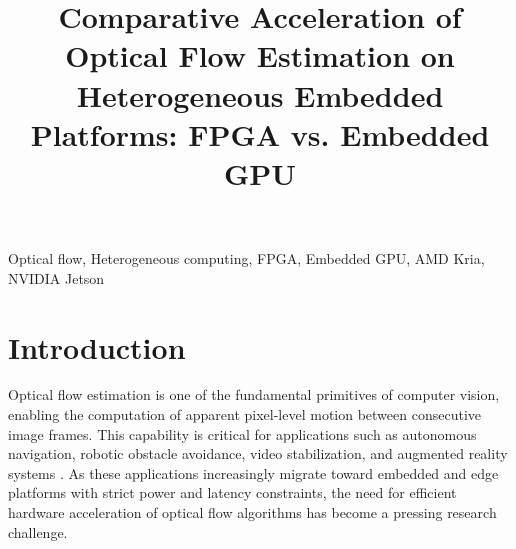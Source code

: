 \documentclass[conference]{IEEEtran}
\begin{document}
\title{Comparative Acceleration of Optical Flow Estimation on Heterogeneous Embedded Platforms: FPGA vs. Embedded GPU}

\author{
\and

\and

\and

}

\maketitle

\begin{IEEEkeywords}
Optical flow, Heterogeneous computing, FPGA, Embedded GPU, AMD Kria, NVIDIA Jetson
\end{IEEEkeywords}

\section{Introduction}

Optical flow estimation is one of the fundamental primitives of computer vision, enabling the computation of apparent pixel-level motion between consecutive image frames. This capability is critical for applications such as autonomous navigation, robotic obstacle avoidance, video stabilization, and augmented reality systems \cite{ref4}. As these applications increasingly migrate toward embedded and edge platforms with strict power and latency constraints, the need for efficient hardware acceleration of optical flow algorithms has become a pressing research challenge.
\end{document}
